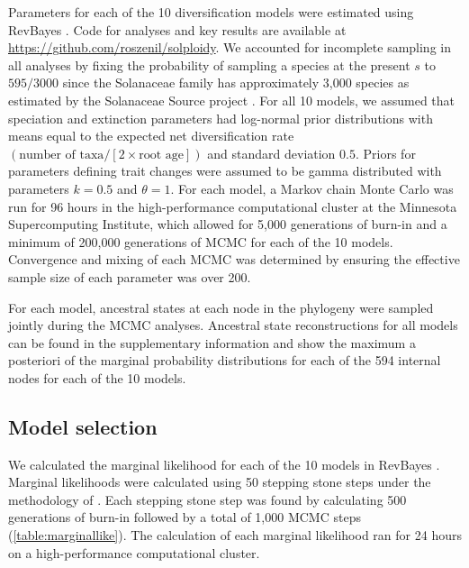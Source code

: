 Parameters for each of the 10 diversification models were estimated using RevBayes \citep{hoehna_2016}.
Code for analyses and key results are available at \url{https://github.com/roszenil/solploidy}.
We accounted for incomplete sampling in all analyses by fixing the probability of sampling a species at the present $s$ to $595/3000$ since the Solanaceae family has approximately 3,000 species as estimated by the Solanaceae Source project \citep{solsource}.
For all 10 models, we assumed that speciation and extinction parameters had log-normal prior distributions with means equal to the expected net diversification rate $(\text{number of taxa} / [2 \times \text{root age}])$ and standard deviation $0.5$.
Priors for parameters defining trait changes were assumed to be gamma distributed with parameters $k=0.5$ and $\theta=1$. 
For each model, a Markov chain Monte Carlo \citep[MCMC;][]{metropolis1953equation,Hastings1970} was run for 96 hours in the high-performance computational cluster at the Minnesota Supercomputing Institute, which allowed for 5,000 generations of burn-in and a minimum of 200,000 generations of MCMC for each of the 10 models. %
Convergence and mixing of each MCMC 
was determined by ensuring the effective sample size of each parameter was over 200.

For each model, ancestral states at each node in the phylogeny were sampled jointly during the MCMC analyses. Ancestral state reconstructions for all models can be found in the supplementary information and show the maximum a posteriori of the marginal probability distributions for each of the 594 internal nodes for each of the 10 models.

\subsection{Model selection}

We calculated the marginal likelihood for each of the 10 models in RevBayes \citep{hoehna_2016}.
Marginal likelihoods were calculated using 50 stepping stone steps under the methodology of \citet{xie_2010}.
Each stepping stone step was found by calculating 500 generations of burn-in followed by a total of 1,000 MCMC steps (\cref{table:marginallike}).
The calculation of each marginal likelihood ran for 24 hours on a high-performance computational cluster.

